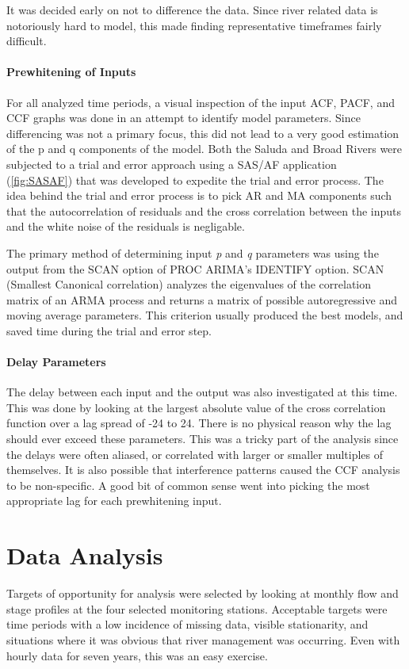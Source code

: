 \documentclass[12pt]{report}
\begin{document}
It was decided early on not to difference the data.  Since river
related data is notoriously hard to model, this made finding
representative timeframes fairly difficult.

\subsubsection{Prewhitening of Inputs}
For all analyzed time periods, a visual inspection of the input
ACF, PACF, and CCF graphs was done in an attempt to identify model
parameters. Since differencing was not a primary focus, this did
not lead to a very good estimation of the p and q components of
the model. Both the Saluda and Broad Rivers were subjected to a
trial and error approach using a SAS/AF application
(\ref{fig:SASAF}) that was developed to expedite the trial and
error process.  The idea behind the trial and error process is to
pick AR and MA components such that the autocorrelation of
residuals and the cross correlation between the inputs and the
white noise of the residuals is negligable.

 The primary method of determining input
\textit{p} and \textit{q} parameters was using the output from the
SCAN option of PROC ARIMA's IDENTIFY option. SCAN (Smallest
Canonical correlation) analyzes the eigenvalues of the correlation
matrix of an ARMA process and returns a matrix of possible
autoregressive and moving average parameters. This criterion
usually produced the best models, and saved time during the trial
and error step.

\subsubsection{Delay
Parameters} The delay between each input and the output was also
investigated at this time.  This was done by looking at the
largest absolute value of the cross correlation function over a
lag spread of -24 to 24. There is no physical reason why the lag
should ever exceed these parameters.  This was a tricky part of
the analysis since the delays were often aliased, or correlated
with larger or smaller multiples of themselves.  It is also
possible that interference patterns caused the CCF analysis to be
non-specific. A good bit of common sense went into picking the
most appropriate lag for each prewhitening input.

\chapter{Data Analysis}
Targets of opportunity for analysis were selected by looking at
monthly flow and stage profiles at the four selected monitoring
stations.  Acceptable targets were time periods with a low
incidence of missing data, visible stationarity, and situations
where it was obvious that river management was occurring.  Even
with hourly data for seven years, this was an easy exercise.
\end{document}
